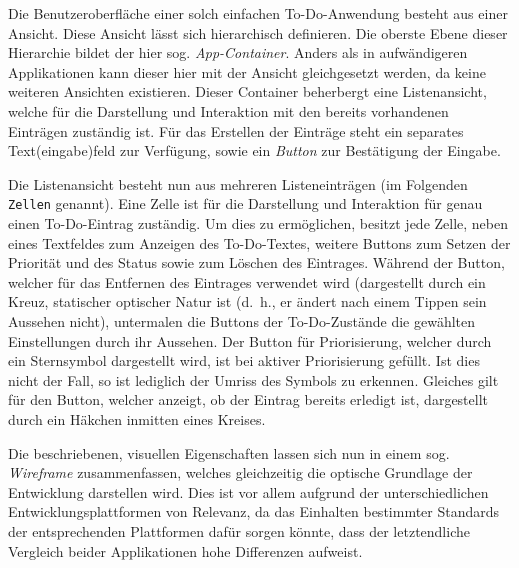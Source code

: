 Die Benutzeroberfläche einer solch einfachen To-Do-Anwendung besteht aus einer Ansicht. Diese Ansicht lässt sich hierarchisch definieren. Die oberste Ebene dieser Hierarchie bildet der hier sog. \textit{App-Container}. Anders als in aufwändigeren Applikationen kann dieser hier mit der Ansicht gleichgesetzt werden, da keine weiteren Ansichten existieren. Dieser Container beherbergt eine Listenansicht, welche für die Darstellung und Interaktion mit den bereits vorhandenen Einträgen zuständig ist. Für das Erstellen der Einträge steht ein separates Text(eingabe)feld zur Verfügung, sowie ein \textit{Button} zur Bestätigung der Eingabe.

Die Listenansicht besteht nun aus mehreren Listeneinträgen (im Folgenden \texttt{Zellen} genannt). Eine Zelle ist für die Darstellung und Interaktion für genau einen To-Do-Eintrag zuständig. Um dies zu ermöglichen, besitzt jede Zelle, neben eines Textfeldes zum Anzeigen des To-Do-Textes, weitere Buttons zum Setzen der Priorität und des Status sowie zum Löschen des Eintrages. Während der Button, welcher für das Entfernen des Eintrages verwendet wird (dargestellt durch ein Kreuz, statischer optischer Natur ist (d.\ h., er ändert nach einem Tippen sein Aussehen nicht), untermalen die Buttons der To-Do-Zustände die gewählten Einstellungen durch ihr Aussehen. Der Button für Priorisierung, welcher durch ein Sternsymbol dargestellt wird, ist bei aktiver Priorisierung gefüllt. Ist dies nicht der Fall, so ist lediglich der Umriss des Symbols zu erkennen. Gleiches gilt für den Button, welcher anzeigt, ob der Eintrag bereits erledigt ist, dargestellt durch ein Häkchen inmitten eines Kreises.

Die beschriebenen, visuellen Eigenschaften lassen sich nun in einem sog. \textit{Wireframe} zusammenfassen, welches gleichzeitig die optische Grundlage der Entwicklung darstellen wird. Dies ist vor allem aufgrund der unterschiedlichen Entwicklungsplattformen von Relevanz, da das Einhalten bestimmter Standards der entsprechenden Plattformen dafür sorgen könnte, dass der letztendliche Vergleich beider Applikationen hohe Differenzen aufweist.

